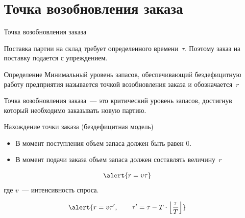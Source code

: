 \documentclass[unicode,11pt,notheorems,xcolor=table]{beamer}
\begin{document}
\section{Точка возобновления заказа}
\begin{frame}{Точка возобновления заказа}

    Поставка партии на склад требует определенного времени~$\tau$. 
    Поэтому заказ на поставку подается с упреждением.    

    \begin{block}{Определение}
        Минимальный уровень запасов, обеспечивающий бездефицитную работу предприятия называется \alert{точкой возобновления заказа} и обозначается~$r$
    \end{block}
 Точка возобновления заказа~--- это критический уровень запасов, достигнув который необходимо заказывать новую партию.
\end{frame}
\begin{frame}{Нахождение точки заказа (бездефицитная модель)}
    \begin{itemize}
        \item В момент поступления объем запаса должен быть равен $0$. 
        \item В момент подачи заказа объем запаса должен составлять величину~$r$
    \end{itemize}
    $$
    \alert{r = v \tau }
    $$
    где $v$~--- интенсивность спроса.

    \bigskip

    $$
    \alert{r= v\tau', \qquad \tau'= \tau - T\cdot \left\lfloor \frac{\tau}{T}\right\rfloor}
    $$
\end{frame}

\end{document}
